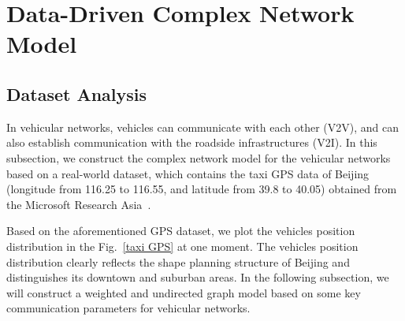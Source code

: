 \documentclass[journal,12pt,draftclsnofoot,onecolumn]{IEEEtran}
\begin{document}
\section{Data-Driven Complex Network Model}
\label{Data-Driven complex network model}

\subsection{Dataset Analysis}
\label{3-1}
In vehicular networks, vehicles can communicate with each other (V2V), and can also establish communication with the roadside infrastructures (V2I). In this subsection, we construct the complex network model for the vehicular networks based on a real-world dataset, which contains the taxi GPS data of Beijing (longitude from 116.25 to 116.55, and latitude from 39.8 to 40.05) obtained from the Microsoft Research Asia~\cite{yuan2010t}.

Based on the aforementioned GPS dataset, we plot the vehicles position distribution in the Fig.~\ref{taxi GPS} at one moment. The vehicles position distribution clearly reflects the shape planning structure of Beijing and distinguishes its downtown and suburban areas. In the following subsection, we will construct a weighted and undirected graph model based on some key communication parameters for vehicular networks.

\end{document}
